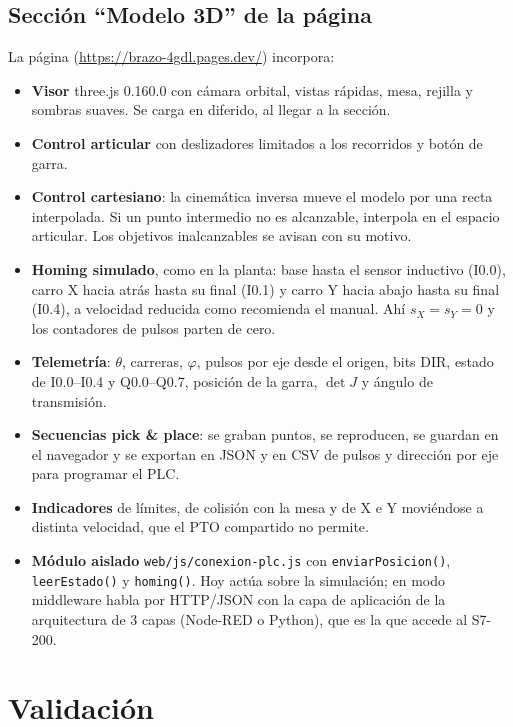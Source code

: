 \documentclass[a4paper,12pt]{article}
\newcommand{\codigo}[1]{\texttt{\small #1}}
\begin{document}
\subsection{Sección ``Modelo 3D'' de la página}
La página (\url{https://brazo-4gdl.pages.dev/}) incorpora:
\begin{itemize}
\item \textbf{Visor} three.js 0.160.0 con cámara orbital, vistas rápidas, mesa, rejilla y sombras suaves.
      Se carga en diferido, al llegar a la sección.
\item \textbf{Control articular} con deslizadores limitados a los recorridos y botón de garra.
\item \textbf{Control cartesiano}: la cinemática inversa mueve el modelo por una recta interpolada. Si un
      punto intermedio no es alcanzable, interpola en el espacio articular. Los objetivos inalcanzables se
      avisan con su motivo.
\item \textbf{Homing simulado}, como en la planta: base hasta el sensor inductivo (I0.0), carro X hacia atrás
      hasta su final (I0.1) y carro Y hacia abajo hasta su final (I0.4), a velocidad reducida como recomienda
      el manual. Ahí $s_X = s_Y = 0$ y los contadores de pulsos parten de cero.
\item \textbf{Telemetría}: $\theta$, carreras, $\varphi$, pulsos por eje desde el origen, bits DIR, estado de
      I0.0--I0.4 y Q0.0--Q0.7, posición de la garra, $\det J$ y ángulo de transmisión.
\item \textbf{Secuencias pick \& place}: se graban puntos, se reproducen, se guardan en el navegador y se
      exportan en JSON y en CSV de pulsos y dirección por eje para programar el PLC.
\item \textbf{Indicadores} de límites, de colisión con la mesa y de X e Y moviéndose a distinta velocidad,
      que el PTO compartido no permite.
\item \textbf{Módulo aislado} \codigo{web/js/conexion-plc.js} con \codigo{enviarPosicion()},
      \codigo{leerEstado()} y \codigo{homing()}. Hoy actúa sobre la simulación; en modo middleware habla
      por HTTP/JSON con la capa de aplicación de la arquitectura de 3 capas (Node-RED o Python), que es la
      que accede al S7-200.
\end{itemize}

\section{Validación}
\end{document}

